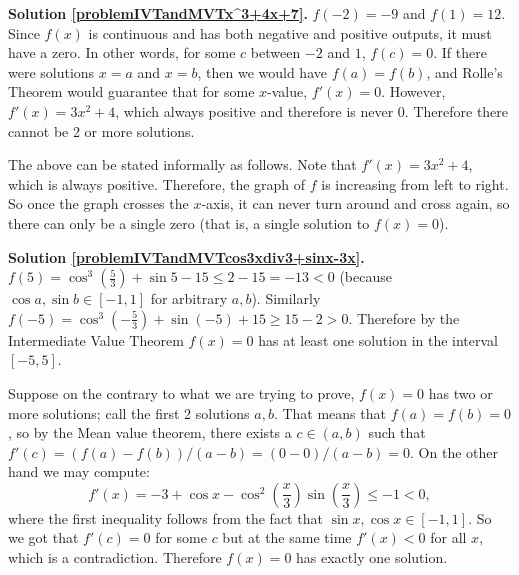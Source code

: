 \textbf{Solution \ref{problemIVTandMVTx^3+4x+7}.}  $f(-2) = -9$ and $f(1) = 12$. Since $f(x)$ is continuous and has both negative and positive outputs, it must have a zero. In other words, for some $c$ between $-2$ and $1$, $f(c) = 0$. If there were solutions $x = a$ and $x = b$,  then we would have $f(a) = f(b)$, and Rolle's Theorem would guarantee that for some $x$-value, $f'(x) = 0$. However, $f'(x) = 3x^2 + 4$, which always positive and therefore is never 0. Therefore there cannot be 2 or more solutions. 

The above can be stated informally as follows. Note that $f'(x) = 3x^2 + 4$, which is always positive. Therefore, the graph of $f$ is increasing from left to right. So once the graph crosses the $x$-axis, it can never turn around and cross again, so there can only be a single zero (that is, a single solution to $f(x) = 0$).


\textbf{Solution \ref{problemIVTandMVTcos3xdiv3+sinx-3x}.} $f(5)= \cos^3 \left( \frac{5}{ 3} \right) +\sin 5-15 \leq 2-15=-13<0 $ (because $\cos a, \sin b\in [-1,1]$ for arbitrary $a, b$). Similarly $f(-5)=\cos^3\left(-\frac{5}{3}\right) +\sin (-5)+15 \geq 15-2>0$. Therefore by the Intermediate Value Theorem $f(x)=0$ has at least one solution in the interval $[-5,5]$.

Suppose on the contrary to what we are trying to prove, $f(x)=0$ has two or more solutions; call the first 2 solutions $a,b$. That means that $f(a)=f(b)=0$, so by the Mean value theorem, there exists a $c\in (a,b)$ such that $f'(c)=(f(a)-f(b))/(a-b)=(0-0)/(a-b)=0$. On the other hand we may compute:
\[ 
f'(x)=-3+\cos x-\cos^{2}\left(\frac{x}3\right)\sin\left(\frac{x}{3}\right) \leq -1<0,
\] 
where the first inequality follows from the fact that $\sin x,\cos x\in [-1,1]$. So we got that $f'(c)=0$ for some $c$ but at the same time $f'(x)<0$ for all $x$, which is a contradiction. Therefore $f(x)=0$ has exactly one solution. 